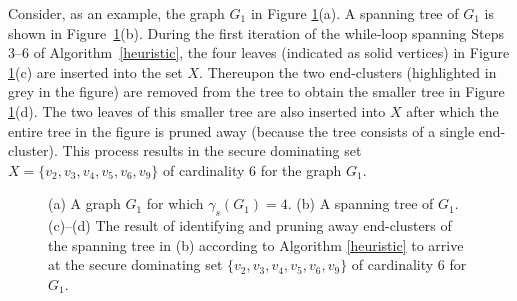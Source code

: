 Consider, as an example, the graph $G_1$ in Figure \ref{treeboundpic}(a).  A spanning tree of $G_1$ is shown in Figure~\ref{treeboundpic}(b).  During the first iteration of the while-loop spanning Steps 3--6 of Algorithm~\ref{heuristic}, the four leaves (indicated as solid vertices) in Figure \ref{treeboundpic}(c) are inserted into the set $X$.  Thereupon the two end-clusters (highlighted in grey in the figure) are removed from the tree to obtain the smaller tree in Figure \ref{treeboundpic}(d).  The two leaves of this smaller tree are also inserted into $X$ after which the entire tree in the figure is pruned away (because the tree consists of a single end-cluster).  This process results in the secure dominating set $X=\{v_2,v_3,v_4,v_5,v_6,v_9\}$ of cardinality $6$ for the graph $G_1$.

\begin{figure}[htb]

\begin{center}  \hspace{0.5cm}  \hspace{0.5cm}  \hspace{0.5cm}  \end{center}

\vspace{-0.6cm}

\caption{(a) A graph $G_1$ for which $\gamma_s(G_1)=4$. (b) A spanning tree of $G_1$. (c)--(d) The result of identifying and pruning away end-clusters of the spanning tree in (b) according to Algorithm \ref{heuristic} to arrive at the secure dominating set $\{v_2,v_3,v_4,v_5,v_6,v_9\}$ of cardinality $6$ for $G_1$.} \label{treeboundpic} \end{figure}